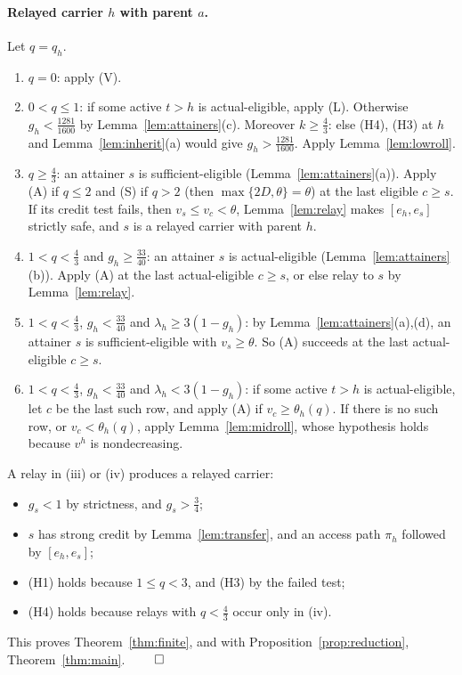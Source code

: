 \documentclass[11pt,a4paper]{article}
\numberwithin{equation}{section}
\theoremstyle{definition}
\begin{document}
\paragraph{Relayed carrier $h$ with parent $a$.} Let $q=q_h$.
\begin{enumerate}[label=(\roman*)]
\item $q=0$: apply (V).
\item $0<q\le1$: if some active $t>h$ is actual-eligible, apply (L). Otherwise
$g_h<\frac{1281}{1600}$ by Lemma~\ref{lem:attainers}(c). Moreover
$k\ge\frac43$: else (H4), (H3) at $h$ and Lemma~\ref{lem:inherit}(a) would give
$g_h>\frac{1281}{1600}$. Apply Lemma~\ref{lem:lowroll}.
\item $q\ge\frac43$: an attainer $s$ is sufficient-eligible
(Lemma~\ref{lem:attainers}(a)). Apply (A) if $q\le2$ and (S) if $q>2$ (then
$\max\{2D,\theta\}=\theta$) at the last eligible $c\ge s$. If its credit test
fails, then $v_s\le v_c<\theta$, Lemma~\ref{lem:relay} makes $[e_h,e_s]$
strictly safe, and $s$ is a relayed carrier with parent $h$.
\item $1<q<\frac43$ and $g_h\ge\frac{33}{40}$: an attainer $s$ is actual-eligible
(Lemma~\ref{lem:attainers}(b)). Apply (A) at the last actual-eligible $c\ge s$,
or else relay to $s$ by Lemma~\ref{lem:relay}.
\item $1<q<\frac43$, $g_h<\frac{33}{40}$ and $\lambda_h\ge3(1-g_h)$: by
Lemma~\ref{lem:attainers}(a),(d), an attainer $s$ is sufficient-eligible with
$v_s\ge\theta$. So (A) succeeds at the last actual-eligible $c\ge s$.
\item $1<q<\frac43$, $g_h<\frac{33}{40}$ and $\lambda_h<3(1-g_h)$: if some active
$t>h$ is actual-eligible, let $c$ be the last such row, and apply (A) if
$v_c\ge\theta_h(q)$. If there is no such row, or $v_c<\theta_h(q)$, apply
Lemma~\ref{lem:midroll}, whose hypothesis holds because $v^h$ is nondecreasing.
\end{enumerate}
A relay in (iii) or (iv) produces a relayed carrier:
\begin{itemize}
\item $g_s<1$ by strictness, and $g_s>\frac34$;
\item $s$ has strong credit by Lemma~\ref{lem:transfer}, and an access path
$\pi_h$ followed by $[e_h,e_s]$;
\item (H1) holds because $1\le q<3$, and (H3) by the failed test;
\item (H4) holds because relays with $q<\frac43$ occur only in (iv).
\end{itemize}
This proves Theorem~\ref{thm:finite}, and with
Proposition~\ref{prop:reduction}, Theorem~\ref{thm:main}. \hfill$\qed$
\end{document}
